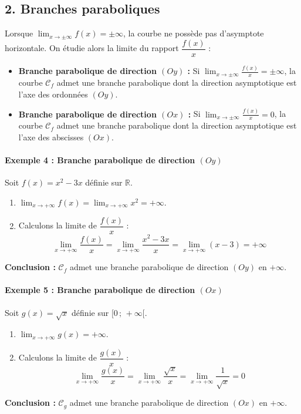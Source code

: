 \documentclass[12pt,a4paper]{article}
\begin{document}
\subsection*{\color{myred}2. Branches paraboliques}

Lorsque $\lim_{x \to \pm\infty} f(x) = \pm\infty$, la courbe ne possède pas d'asymptote horizontale. On étudie alors la limite du rapport $\dfrac{f(x)}{x}$ :

\begin{tcolorbox}[colback=gray!5!white,colframe=black,title=\textbf{Définitions : Les deux directions paraboliques}]
\begin{itemize}
    \item \textbf{Branche parabolique de direction $(Oy)$ :}
    Si $\lim_{x \to \pm\infty} \frac{f(x)}{x} = \pm\infty$, la courbe $\mathcal{C}_f$ admet une branche parabolique dont la direction asymptotique est l'axe des ordonnées $(Oy)$.
    \item \textbf{Branche parabolique de direction $(Ox)$ :}
    Si $\lim_{x \to \pm\infty} \frac{f(x)}{x} = 0$, la courbe $\mathcal{C}_f$ admet une branche parabolique dont la direction asymptotique est l'axe des abscisses $(Ox)$.
\end{itemize}
\end{tcolorbox}

\paragraph{Exemple 4 : Branche parabolique de direction $(Oy)$}
Soit $f(x) = x^2 - 3x$ définie sur $\mathbb{R}$.
\begin{enumerate}
    \item $\lim_{x \to +\infty} f(x) = \lim_{x \to +\infty} x^2 = +\infty$.
    \item Calculons la limite de $\dfrac{f(x)}{x}$ :
    \[
    \lim_{x \to +\infty} \frac{f(x)}{x} = \lim_{x \to +\infty} \frac{x^2 - 3x}{x} = \lim_{x \to +\infty} (x - 3) = +\infty
    \]
\end{enumerate}
\textbf{Conclusion :} $\mathcal{C}_f$ admet une branche parabolique de direction $(Oy)$ en $+\infty$.

\paragraph{Exemple 5 : Branche parabolique de direction $(Ox)$}
Soit $g(x) = \sqrt{x}$ définie sur $[0 \,;\, +\infty[$.
\begin{enumerate}
    \item $\lim_{x \to +\infty} g(x) = +\infty$.
    \item Calculons la limite de $\dfrac{g(x)}{x}$ :
    \[
    \lim_{x \to +\infty} \frac{g(x)}{x} = \lim_{x \to +\infty} \frac{\sqrt{x}}{x} = \lim_{x \to +\infty} \frac{1}{\sqrt{x}} = 0
    \]
\end{enumerate}
\textbf{Conclusion :} $\mathcal{C}_g$ admet une branche parabolique de direction $(Ox)$ en $+\infty$.
\end{document}
